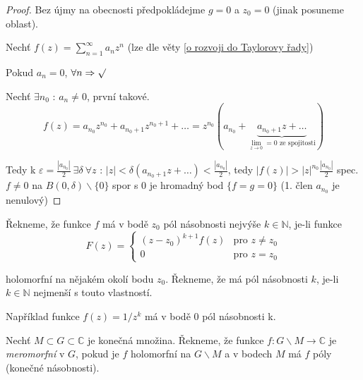 \begin{proof}
Bez újmy na obecnosti předpokládejme $g=0$ a $z_0=0$ (jinak posuneme oblast).

Nechť $f(z) = \sum_{n=1}^\infty a_n z^n$ (lze dle věty \ref{o rozvoji do Taylorovy řady})

Pokud $a_n = 0$, $\forall n \Rightarrow \surd$

Nechť $\exists n_0 \textrm{ : } a_n \neq 0$, první takové. 
$$f(z) = a_{n_0} z^{n_0} + a_{n_0 + 1} z^{n_0 + 1} + \ldots = z^{n_0} \left( a_{n_0} + \underbrace{a_{n_0 + 1} z + \ldots}_{\lim_{z \to 0} = 0 \textrm{ ze spojitosti}} \right)$$

Tedy k $\varepsilon = \frac{|a_{n_0}|}{2} \ \exists \delta \ \forall z \textrm{ : } |z| < \delta (a_{n_0 + 1} z + \ldots) < \frac{|a_{n_0}|}{2}$, tedy $|f(z)| > |z|^{n_0} \frac{|a_{n_0}|}{2}$ spec. $f \neq 0$ na $B(0, \delta) \backslash \{ 0 \}$ spor s $0$ je hromadný bod $\{ f = g = 0 \}$ (1. člen $a_{n_0}$ je nenulový)
\end{proof}


\begin{definice}
Řekneme, že funkce $f$ má v bodě $z_0$ pól násobnosti nejvýše $k \in \mathbb{N}$, je-li funkce 
\begin{equation}
F(z) = \left\{ \begin{array}{ll}
 (z-z_0)^{k+1}f(z) & \textrm{pro $z \neq z_0$} \nonumber\\
 0 & \textrm{pro $z=z_0$}
  \end{array} \right.
\end{equation}

holomorfní na nějakém okolí bodu $z_0$. Řekneme, že má pól násobnosti $k$, je-li $k \in \mathbb{N}$ nejmenší s touto vlastností.
\end{definice}

Například funkce $f(z) = 1 / z^k$ má v bodě 0 pól násobnosti k.

\begin{definice}
Nechť $M \subset G \subset \mathbb{C}$ je konečná množina. Řekneme, že funkce $f : G \backslash M \rightarrow \mathbb{C}$ je \emph{meromorfní} v $G$, pokud je $f$ holomorfní na $G \backslash M$ a v bodech $M$ má $f$ póly (konečné násobnosti).
\end{definice}

